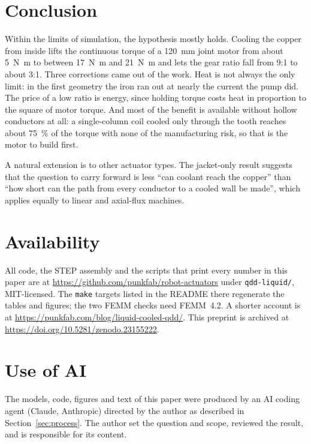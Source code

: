 \documentclass[11pt]{article}
\newcommand{\code}[1]{\texttt{\small #1}}
\newcommand{\Nm}{\si{N.m}}
\begin{document}
\section{Conclusion}

Within the limits of simulation, the hypothesis mostly holds. Cooling the
copper from inside lifts the continuous torque of a
\diameter\SI{120}{mm} joint motor from about \SI{5}{\Nm} to between
\SI{17}{\Nm} and \SI{21}{\Nm} and lets the gear ratio fall from
\num{9}:\num{1} to about \num{3}:\num{1}. Three corrections came out of the
work. Heat is not always the only limit: in the first geometry the iron ran
out at nearly the current the pump did. The price of a low ratio is energy,
since holding torque costs heat in proportion to the square of motor torque.
And most of the benefit is available without hollow conductors at all: a
single-column coil cooled only through the tooth reaches about
\SI{75}{\percent} of the torque with none of the manufacturing risk, so that
is the motor to build first.

A natural extension is to other actuator types. The jacket-only result
suggests that the question to carry forward is less ``can
coolant reach the copper'' than ``how short can the path from every conductor
to a cooled wall be made'', which applies equally to linear and axial-flux
machines.

\section*{Availability}

All code, the STEP assembly and the scripts that print every number in this
paper are at \url{https://github.com/punkfab/robot-actuators} under
\code{qdd-liquid/}, MIT-licensed. The \code{make} targets listed in the
README there regenerate the tables and figures; the two FEMM checks need
FEMM~4.2. A shorter account is at
\url{https://punkfab.com/blog/liquid-cooled-qdd/}. This preprint is archived at
\url{https://doi.org/10.5281/zenodo.23155222}.

\section*{Use of AI}

The models, code, figures and text of this paper were produced by an AI coding
agent (Claude, Anthropic) directed by the author as described in
Section~\ref{sec:process}. The author set the question and scope, reviewed the
result, and is responsible for its content.



\end{document}

